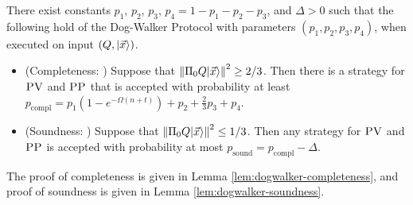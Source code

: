 \begin{theorem}\label{thm:dog-walker}
There exist constants $p_1$, $p_2$, $p_3$, $p_4=1-p_1-p_2-p_3$, and $\Delta>0$ such that the following hold of the Dog-Walker Protocol with parameters $(p_1,p_2,p_3,p_4)$, when executed on input $(Q,|\vec{x}\rangle)$.
\begin{itemize}
\item (Completeness: ) Suppose that $\left\|\Pi_0Q|\vec{x}\rangle\right\|^2\geq 2/3$. Then
  there is a strategy for $\textsc{PV}$ and $\textsc{PP}$ that is accepted with probability at
    least $p_{\mathrm{compl}}=p_1(1-e^{-\Omega(n+t)})+p_2+\frac{2}{3}p_3 +
    p_4$. 
\item (Soundness: ) Suppose that $\left\|\Pi_0Q|\vec{x}\rangle\right\|^2\leq 1/3$. Then any strategy for $\textsc{PV}$ and $\textsc{PP}$ is accepted with probability at most $p_{\mathrm{sound}}=p_{\mathrm{compl}}-\Delta$. 
\end{itemize}
\end{theorem}
\noindent The proof of completeness is given in Lemma \ref{lem:dogwalker-completeness}, and proof of soundness is given in Lemma \ref{lem:dogwalker-soundness}. 

